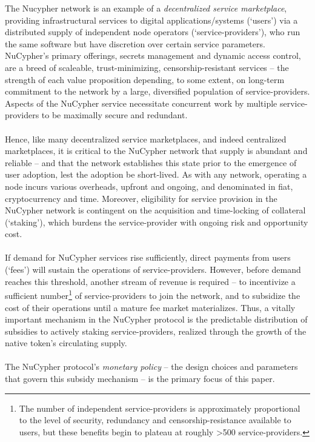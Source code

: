 \documentclass[longbibliography,nofootinbib]{revtex4-1}
\begin{document}
The Nucypher network is an example of a \textit{decentralized service marketplace}, providing infrastructural services to digital applications/systems (`users') via a distributed supply of independent node operators (`service-providers'), who run the same software but have discretion over certain service parameters. NuCypher's primary offerings, secrets management and dynamic access control, are a breed of scaleable, trust-minimizing, censorship-resistant services – the strength of each value proposition depending, to some extent, on long-term commitment to the network by a large, diversified population of service-providers. Aspects of the NuCypher service necessitate concurrent work by multiple service-providers to be maximally secure and redundant.
\\\\
Hence, like many decentralized service marketplaces, and indeed centralized marketplaces, it is critical to the NuCypher network that supply is abundant and reliable – and that the network establishes this state prior to the emergence of user adoption, lest the adoption be short-lived. As with any network, operating a node incurs various overheads, upfront and ongoing, and denominated in fiat, cryptocurrency and time. Moreover, eligibility for service provision in the NuCypher network is contingent on the acquisition and time-locking of collateral (`staking'), which burdens the service-provider with ongoing risk and opportunity cost.
\\\\
If demand for NuCypher services rise sufficiently, direct payments from users (`fees') will sustain the operations of service-providers. However, before demand reaches this threshold, another stream of revenue is required – to incentivize a sufficient number\footnote[1]{The number of independent service-providers is approximately proportional to the level of security, redundancy and censorship-resistance available to users, but these benefits begin to plateau at roughly >500 service-providers.} of service-providers to join the network, and to subsidize the cost of their operations until a mature fee market materializes. Thus, a vitally important mechanism in the NuCypher protocol is the predictable distribution of subsidies to actively staking service-providers, realized through the growth of the native token's circulating supply. 
\\\\
The NuCypher protocol's \textit{monetary policy} – the design choices and parameters that govern this subsidy mechanism – is the primary focus of this paper. 
\end{document}
